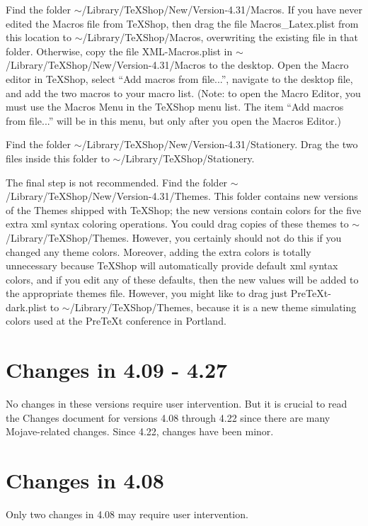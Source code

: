 \documentclass[11pt, oneside]{amsart}
\begin{document}
Find the folder $\sim$/Library/TeXShop/New/Version-4.31/Macros. If you have never edited the Macros file from TeXShop, then drag the file Macros\_Latex.plist from this location to $\sim$/Library/TeXShop/Macros, overwriting the existing file in that folder. Otherwise, copy the file XML-Macros.plist in $\sim$/Library/TeXShop/New/Version-4.31/Macros to the desktop. Open the Macro editor in TeXShop, select ``Add macros from file...'', navigate to the desktop file, and add the two macros to your macro list. (Note: to open the Macro Editor, you must use the Macros Menu in the TeXShop menu list. The item ``Add macros from file...'' will be in this menu, but only after you open the Macros Editor.)

Find the folder $\sim$/Library/TeXShop/New/Version-4.31/Stationery. Drag the two files inside this folder to $\sim$/Library/TeXShop/Stationery.

The final step is not recommended. Find the folder $\sim$/Library/TeXShop/New/Version-4.31/Themes.
This folder contains new versions of the Themes shipped with TeXShop; the new versions contain colors for the five extra xml syntax coloring operations. You could drag copies of these themes to $\sim$/Library/TeXShop/Themes. However, you certainly should not do this if you changed any theme colors. Moreover, adding the extra colors is totally unnecessary because TeXShop will automatically provide default xml syntax colors, and if you edit any of these defaults, then the new values will be added to the appropriate themes file. However, you might like to drag just PreTeXt-dark.plist to $\sim$/Library/TeXShop/Themes, because it is a new theme simulating colors used at the PreTeXt conference in Portland.





\section{Changes in 4.09 - 4.27}

No changes in these versions require user intervention. But it is crucial to read the Changes document for versions 4.08 through 4.22 since there are many Mojave-related changes. Since 4.22, changes have been minor.

\section{Changes in 4.08}

Only two changes in 4.08 may require user intervention.
\end{document}
